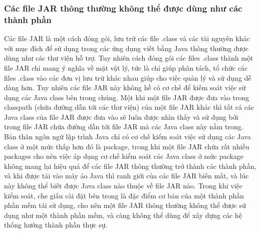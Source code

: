 \subsubsection{Các file JAR thông thường không thể được dùng như các thành phần}
Các file JAR là một cách đóng gói, lưu trữ các file .class và các tài nguyên khác \cite{jar} với mục đích để sử dụng trong các ứng dụng viết bằng Java thông thường được dùng như các thư viện hỗ trợ. Tuy nhiên cách đóng gói các files .class thành một file JAR chỉ mang ý nghĩa về mặt vật lý, tức là chỉ giúp phân tách, tổ chức các files .class vào các đơn vị lưu trữ khác nhau giúp cho việc quản lý và sử dụng dễ dàng hơn. Tuy nhiên các file JAR này không hề có cơ chế để kiếm soát việc sử dụng các Java class bên trong chúng. Một khi một file JAR được đưa vào trong classpath (chứa đường dẫn tới các thư viện) của một file JAR khác thì tất cả các Java class của file JAR được đưa vào sẽ luôn được nhìn thấy và sử dụng bởi trong file JAR chứa đường dẫn tới file JAR mà các Java class này nằm trong. Bản thân ngôn ngữ lập trình Java chỉ có cơ chế kiểm soát việc sử dụng các Java class ở một mức thấp hơn đó là package, trong khi một file JAR chứa rất nhiều packages cho nên việc áp dụng cơ chế kiểm soát các Java class ở mức package không mang lại hiệu quả để các file JAR thông thường trở thành các thành phần, và khi được tải vào máy ảo Java thì ranh giới của các file JAR biến mất, và lúc này không thể biết được Java class nào thuộc về file JAR nào. Trong khi việc kiểm soát, che giấu cài đặt bên trong là đặc điểm cơ bản của một thành phần phần mềm tái sử dụng, cho nên một file JAR thông thường không thể được sử dụng như một thành phần mềm, và càng không thể dùng để xây dựng các hệ thống hướng thành phần thực sự.


